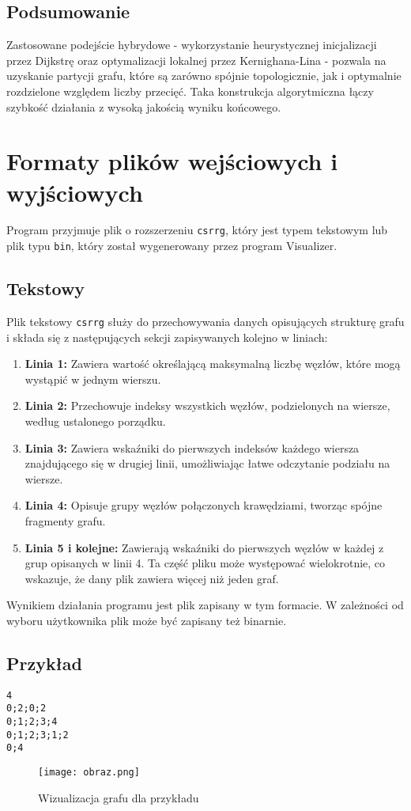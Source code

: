 \documentclass[a4paper,12pt]{article}
\begin{document}
\subsection{Podsumowanie}
Zastosowane podejście hybrydowe - wykorzystanie heurystycznej inicjalizacji przez Dijkstrę oraz optymalizacji lokalnej przez Kernighana-Lina - pozwala na uzyskanie partycji grafu, które są zarówno spójnie topologicznie, jak i optymalnie rozdzielone względem liczby przecięć. Taka konstrukcja algorytmiczna łączy szybkość działania z wysoką jakością wyniku końcowego.

\section{Formaty plików wejściowych i wyjściowych}
Program przyjmuje plik o rozszerzeniu \texttt{csrrg}, który jest typem tekstowym lub plik typu \texttt{bin}, który został wygenerowany przez program Visualizer.
\subsection*{Tekstowy}
Plik tekstowy \texttt{csrrg} służy do przechowywania danych opisujących strukturę grafu i składa się z następujących sekcji zapisywanych kolejno w liniach:
\begin{enumerate}
    \item \textbf{Linia 1:} Zawiera wartość określającą maksymalną liczbę węzłów, które mogą wystąpić w jednym wierszu.
    \item \textbf{Linia 2:} Przechowuje indeksy wszystkich węzłów, podzielonych na wiersze, według ustalonego porządku.
    \item \textbf{Linia 3:} Zawiera wskaźniki do pierwszych indeksów każdego wiersza znajdującego się w drugiej linii, umożliwiając łatwe odczytanie podziału na wiersze.
    \item \textbf{Linia 4:} Opisuje grupy węzłów połączonych krawędziami, tworząc spójne fragmenty grafu.
    \item \textbf{Linia 5 i kolejne:} Zawierają wskaźniki do pierwszych węzłów w każdej z grup opisanych w linii 4. Ta część pliku może występować wielokrotnie, co wskazuje, że dany plik zawiera więcej niż jeden graf.
\end{enumerate}
Wynikiem działania programu jest plik zapisany w tym formacie. W zależności od wyboru użytkownika plik może być zapisany też binarnie.

\subsection*{Przykład}
\begin{lstlisting}
4
0;2;0;2
0;1;2;3;4
0;1;2;3;1;2
0;4
\end{lstlisting}
\begin{figure}[h!]
    \centering
    \texttt{[image: obraz.png]}
    \caption{Wizualizacja grafu dla przykładu}
    \label{fig:enter-label}
\end{figure}
\end{document}

